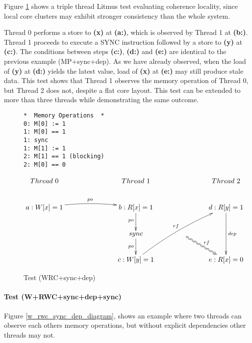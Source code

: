 		Figure \ref{wrc_sync_dep_diagram} shows a triple thread Litmus test evaluating coherence locality, since local core clusters may exhibit stronger consistency than the whole system. 
		
		Thread 0 performs a store to \textbf{(x)} at \textbf{(a:)}, which is observed by Thread 1 at \textbf{(b:)}. Thread 1 proceeds to execute a SYNC instruction followed by a store to \textbf{(y)} at \textbf{(c:)}. The conditions between steps \textbf{(c:)}, \textbf{(d:)} and \textbf{(e:)} are identical to the previous example (MP+sync+dep). As we have already observed, when the load of \textbf{(y)} at \textbf{(d:)} yields the latest value, load of \textbf{(x)} at \textbf{(e:)} may still produce stale data. This test shows that Thread 1 observes the memory operation of Thread 0, but Thread 2 does not, despite a flat core layout. This test can be extended to more than three threads while demonstrating the same outcome.
		
\begin{figure}[!h]
\begin{tcolorbox}[
colback=green!1!white,
colframe=green!75!black]
\begin{center}
\begin{BVerbatim}
*  Memory Operations  *
0: M[0] := 1
1: M[0] == 1
1: sync
1: M[1] := 1
2: M[1] == 1 (blocking)
2: M[0] == 0
\end{BVerbatim}
\end{center}

\vspace{1mm}

\begin{displaymath}
	\xymatrix{
		Thread \ 0 & \ \ \ \ \ \  & Thread \ 1  & \ \ \ \ \ \  & Thread \ 2\\
		a: W[x] = 1 \ar@/^/@{->}[rr]^{po} & & b: R[x] = 1 \ar[d]_{po} & & d: R[y] = 1 \ar[dd]^{dep} \\
		& & sync \ar[d]_{po} & \ \ \ \ar@2{~>}[dr]^{rf} & \\
		& & c: W[y] = 1 \ar@/^/@{->}[uurr]^{rf} & & e: R[x] = 0
	}
\end{displaymath}
\end{tcolorbox}
\caption{Test (WRC+sync+dep)}
\label{wrc_sync_dep_diagram}
\end{figure}


\clearpage	
\paragraph{Test (W+RWC+sync+dep+sync)}
		Figure \ref{w_rwc_sync_dep_diagram}, shows an example where two threads can observe each others memory operations, but without explicit dependencies other threads may not. 
		
